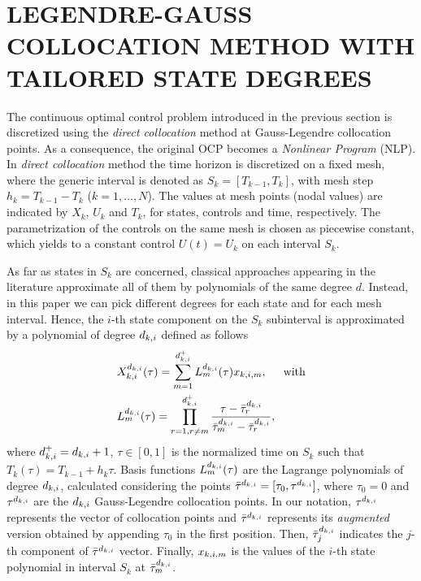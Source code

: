 \section*{LEGENDRE-GAUSS COLLOCATION METHOD WITH TAILORED STATE DEGREES}
The %
continuous optimal control problem introduced in the previous section is discretized using the \emph{direct collocation} method at Gauss-Legendre collocation points. As a consequence, the original OCP becomes a \emph{Nonlinear Program} (NLP). In \emph{direct collocation} method the time horizon is discretized on a fixed mesh, where the generic interval is denoted as $S_{k} = [T_{k-1}, T_{k}]$, with mesh step $h_{k} = T_{k-1} - T_{k}$ ($k = 1, \ldots, N $). The values at mesh points (nodal values) are indicated by $X_{k}$, $U_{k}$ and $T_{k}$, for  states, controls and time, respectively.
The parametrization of the controls on the same mesh is chosen as piecewise constant, which yields to a constant control $U(t) = U_{k}$ on each interval $S_k$.

As far as states in $S_{k}$ are concerned, classical approaches appearing in the literature approximate all of them by polynomials of the same degree $d$.
Instead, in this paper we can pick different degrees for each state and for each mesh interval. Hence, the $i$-th state component on the $S_{k}$ subinterval is approximated by a polynomial of degree $d_{k,i}$ defined as follows
\begin{subequations}
	\begin{align}
	&X_{k,i}^{d_{k,i}} (\tau) = \sum_{m=1}^{d_{k,i}^{+}} L_{m}^{d_{k,i}}(\tau)x_{k,i,m}, \hspace{5mm} \text{with} \label{Xpoly}\\
	&L_{m}^{d_{k,i}} (\tau) = \prod_{r=1, r\neq m}^{d_{k,i}^{+}} \dfrac{\tau - \bar{\tau}^{d_{k,i}}_{r}}{\bar{\tau}^{d_{k,i}}_{m} - \bar{\tau}^{d_{k,i}}_{r}}, \label{BLagrange}
	\end{align}
\end{subequations}
where $d_{k,i}^{+} = d_{k,i} + 1$, $\tau \in [0,1]$ is the normalized time on $S_k$ such that $T_k(\tau) = T_{k-1} + h_k\tau$.
Basis functions $L_{m}^{d_{k,i}} (\tau)$ are the Lagrange polynomials of degree $d_{k,i}$, calculated considering the points $\bar{\tau}^{d_{k,i}} = [\tau_{0}, \tau^{d_{k,i}}]$, where $\tau_{0} = 0$ and $\tau^{d_{k,i}}$ are the $d_{k,i}$ Gauss-Legendre collocation points. In our notation, $\tau^{d_{k,i}}$  represents the vector of collocation points and $\bar{\tau}^{d_{k,i}}$ represents its \emph{augmented} version obtained by appending $\tau_{0}$ in the first position.
Then, $\bar{\tau}^{d_{k,i}}_{j}$ indicates the $j$-th component of $\bar{\tau}^{d_{k,i}}$ vector.
Finally, $x_{k,i,m}$ is the values of the $i$-th state polynomial in interval $S_k$ at $\bar{\tau}^{d_{k,i}}_{m}$.

